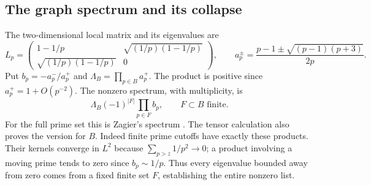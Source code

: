 \subsection{The graph spectrum and its collapse}\label{finapp:spectrum}
The two-dimensional local matrix and its eigenvalues are
\[
 L_p=\begin{pmatrix}
 1-1/p&\sqrt{(1/p)(1-1/p)}\\
 \sqrt{(1/p)(1-1/p)}&0
 \end{pmatrix},\qquad
 a_p^\pm=\frac{p-1\pm\sqrt{(p-1)(p+3)}}{2p}.
\]
Put $b_p=-a_p^-/a_p^+$ and $\Lambda_B=\prod_{p\in B}a_p^+$.
The product is positive since $a_p^+=1+O(p^{-2})$.
The nonzero spectrum, with multiplicity, is
\begin{equation}\label{fin:localspectrum}
 \Lambda_B(-1)^{|F|}\prod_{p\in F}b_p,\qquad F\subset B\text{ finite}.
\end{equation}
For the full prime set this is Zagier's spectrum
\cite[Appendix C]{finCoprimeChain}.
The tensor calculation also proves the version for $B$.
Indeed finite prime cutoffs have exactly these products.
Their kernels converge in $L^2$ because
$\sum_{p>z}1/p^2\to0$; a product involving a moving prime tends to zero
since $b_p\sim1/p$.  Thus every eigenvalue bounded away from zero
comes from a fixed finite set $F$, establishing the entire nonzero
list.


